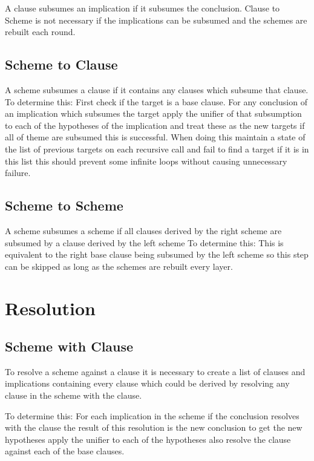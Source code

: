 \documentclass{article}
\begin{document}
  A clause subsumes an implication if it subsumes the conclusion.
  Clause to Scheme is not necessary if the implications can be subsumed and the schemes are rebuilt each round.
 
\subsection{Scheme to Clause}
A scheme subsumes a clause if it contains any clauses which subsume that clause.
To determine this: 
  First check if the target is a base clause.
  For any conclusion of an implication which subsumes the target
    apply the unifier of that subsumption to each of the hypotheses of the implication and treat these as the new targets
    if all of theme are subsumed this is successful.
  When doing this maintain a state of the list of previous targets on each recursive call and fail to find a target if it is in this list
  this should prevent some infinite loops without causing unnecessary failure.

\subsection{Scheme to Scheme}

A scheme subsumes a scheme if all clauses derived by the right scheme are subsumed by a clause derived by the left scheme
To determine this:
  This is equivalent to the right base clause being subsumed by the left scheme
  so this step can be skipped as long as the schemes are rebuilt every layer.

\section{Resolution}

\subsection{Scheme with Clause}

To resolve a scheme against a clause it is necessary to create a list of clauses and implications containing every
clause which could be derived by resolving any clause in the scheme with the clause. 

To determine this:
For each implication in the scheme if the conclusion resolves with the clause 
  the result of this resolution is the new conclusion
  to get the new hypotheses apply the unifier to each of the hypotheses
  also resolve the clause against each of the base clauses.
\end{document}

